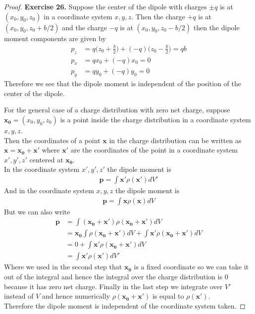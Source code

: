 \documentclass[11pt]{article}
\theoremstyle{definition}
\begin{document}
\cleardoublepage
\begin{proof}{\textbf{Exercise 26.}}
Suppose the center of the dipole with charges $\pm q$ is at $(x_0, y_0, z_0)$
in a coordinate system $x,y,z$.
Then the charge $+q$ is at $(x_0, y_0, z_0 + b/2)$ and the charge $-q$ is at
$(x_0, y_0, z_0 - b/2)$ then the dipole moment components are given by
\begin{align*}
    p_z &= q\bigg(z_0 + \frac{b}{2}\bigg) + (-q)\bigg(z_0 - \frac{b}{2}\bigg)
    = qb\\
    p_x &= qx_0 + (-q)x_0 = 0\\
    p_y &= qy_0 + (-q)y_0 = 0
\end{align*}
Therefore we see that the dipole moment is independent of the position of the
center of the dipole.

For the general case of a charge distribution with zero net charge, suppose
$\bm{x_0} = (x_0, y_0, z_0)$ is a point inside the charge distribution in a
coordinate system $x,y,z$.
\\
Then the coordinates of a point $\bm{x}$ in the charge distribution can be
written as $\bm{x} = \bm{x_0} + \bm{x}'$ where $\bm{x}'$ are the coordinates
of the point in a coordinate system $x',y',z'$ centered at $\bm{x_0}$.
\\
In the coordinate system $x',y',z'$ the dipole moment is
\begin{align*}
    \bm{p} = \int \bm{x}'\rho(\bm{x}')dV'
\end{align*}
And in the coordinate system $x,y,z$ the dipole moment is
\begin{align*}
    \bm{p} = \int \bm{x}\rho(\bm{x})dV
\end{align*}
But we can also write
\begin{align*}
    \bm{p} &= \int (\bm{x_0} + \bm{x}')\rho(\bm{x_0} + \bm{x}')dV\\
    &= \bm{x_0}\int \rho(\bm{x_0} + \bm{x}')dV + \int\bm{x}'\rho(\bm{x_0} + \bm{x}')dV\\
    &= 0 + \int\bm{x}'\rho(\bm{x_0} + \bm{x}')dV\\
    &= \int\bm{x}'\rho(\bm{x}')dV'
\end{align*}
Where we used in the second step that $\bm{x_0}$ is a fixed coordinate so we
can take it out of the integral and hence the integral over the charge
distribution is 0 because it has zero net charge.
Finally in the last step we integrate over $V'$ instead of $V$ and hence
numerically $\rho(\bm{x_0} + \bm{x}')$ is equal to $\rho(\bm{x}')$.
\\
Therefore the dipole moment is independent of the coordinate system taken.
\end{proof}
\end{document}
